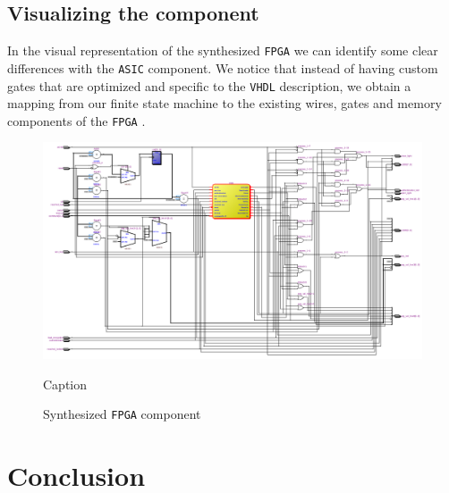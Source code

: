 \documentclass[a4paper,11pt]{article}
\begin{document}
	\subsection{Visualizing the component}
	\par In the visual representation of the synthesized \texttt{FPGA} we can identify some clear differences with the \texttt{ASIC} component. We notice that instead of having custom gates that are optimized and specific to the \texttt{VHDL} description, we obtain a mapping from our finite state machine to the existing wires, gates and memory components of the \texttt{FPGA} .
	\begin{figure}[H]
	    \centering
	    \includegraphics[width=0.9\linewidth]{PROJECT1.png}
	    \caption{Caption}
	    \caption{Synthesized \texttt{FPGA} component}
	\end{figure}

	\section{Conclusion}
	
\end{document}
